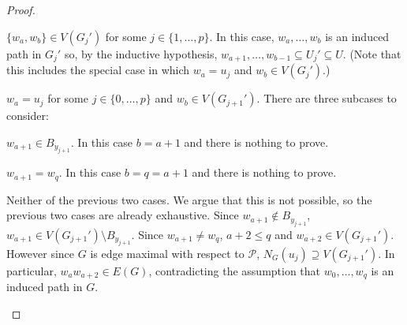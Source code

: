 \documentclass[kpfonts]{patmorin}
\theoremstyle{named}
\begin{document}
\begin{proof}
\begin{compactenum}
       \item $\{w_a,w_b\}\in V(G_j')$ for some $j\in\{1,\ldots,p\}$. In this case, $w_a,\ldots,w_b$ is an induced path in $G_j'$ so, by the inductive hypothesis, $w_{a+1},\ldots,w_{b-1}\subseteq U_j'\subseteq U$.  (Note that this includes the special case in which $w_a=u_j$ and $w_b\in V(G_j')$.)

       \item $w_a = u_j$ for some $j\in\{0,\ldots,p\}$ and $w_b\in V(G_{j+1}')$.  There are three subcases to consider:
       \begin{compactenum}
            \item $w_{a+1}\in B_{y_{j+1}}$.  In this case $b=a+1$ and there is nothing to prove.

            \item $w_{a+1}=w_q$. In this case $b=q=a+1$ and there is nothing to prove.

            \item Neither of the previous two cases. We argue that this is not possible, so the previous two cases are already exhaustive.  Since $w_{a+1}\not\in B_{y_{j+1}}$, $w_{a+1}\in V(G_{j+1}')\setminus B_{y_{j+1}}$. Since $w_{a+1}\neq w_q$, ${a+2}\le q$ and $w_{a+2}\in V(G_{j+1}')$.  However since $G$ is edge maximal with respect to $\mathcal{P}$, $N_G(u_j)\supseteq V(G_{j+1}')$. In particular, $w_aw_{a+2}\in E(G)$, contradicting the assumption that $w_0,\ldots,w_q$ is an induced path in $G$. \qedhere
        \end{compactenum}
    \end{compactenum}
\end{proof}
\end{document}
